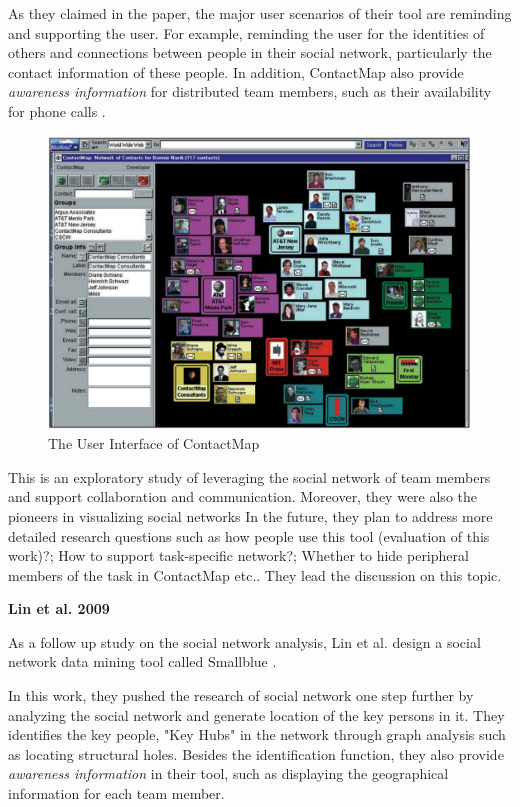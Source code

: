 As they claimed in the paper, the major user scenarios of their tool are reminding and supporting the user. For example, reminding the user for the identities of others and connections between people in their social network, particularly the contact information of these people. In addition, ContactMap also provide \textit{awareness information} for distributed team members, such as their availability for phone calls \cite{dourish1992awareness}.

\begin{figure}
\includegraphics[width = 1\columnwidth]{ContactMap.png}
\centering
\caption{The User Interface of ContactMap \cite{nardi2002integrating}}
\label{ContactMap}
\end{figure}

This is an exploratory study of leveraging the social network of team members and support collaboration and communication. Moreover, they were also the pioneers in visualizing social networks  In the future, they plan to address more detailed research questions such as how people use this tool (evaluation of this work)?; How to support task-specific network?; Whether to hide peripheral members of the task in ContactMap etc.. They lead the discussion on this topic.

\textbf{Lin et al. 2009}

As a follow up study on the social network analysis, Lin et al. design a social network data mining tool called Smallblue \cite{lin2009smallblue}.

In this work, they pushed the research of social network one step further by analyzing the social network and generate location of the key persons in it. They identifies the key people, "Key Hubs" in the network through graph analysis such as locating structural holes. Besides the identification function, they also provide \textit{awareness information} in their tool, such as displaying the geographical information for each team member.

